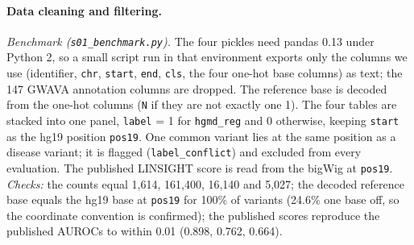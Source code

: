 \documentclass[11pt]{article}
\newcommand{\file}[1]{\nolinkurl{#1}}
\begin{document}
\paragraph{Data cleaning and filtering.}
\emph{Benchmark (\file{s01_benchmark.py}).} The four pickles need pandas 0.13 under Python 2, so a small
script run in that environment exports only the columns we use (identifier, \texttt{chr}, \texttt{start},
\texttt{end}, \texttt{cls}, the four one-hot base columns) as text; the 147 GWAVA annotation columns are
dropped. The reference base is decoded from the one-hot columns (\texttt{N} if they are not exactly one 1).
The four tables are stacked into one panel, \texttt{label} = 1 for \file{hgmd_reg} and 0 otherwise, keeping
\texttt{start} as the hg19 position \texttt{pos19}. One common variant lies at the same position as a
disease variant; it is flagged (\texttt{label\_conflict}) and excluded from every evaluation. The published
LINSIGHT score is read from the bigWig at \texttt{pos19}. \emph{Checks:} the counts equal 1,614, 161,400,
16,140 and 5,027; the decoded reference base equals the hg19 base at \texttt{pos19} for 100\% of variants
(24.6\% one base off, so the coordinate convention is confirmed); the published scores reproduce the
published AUROCs to within 0.01 (0.898, 0.762, 0.664).
\end{document}
